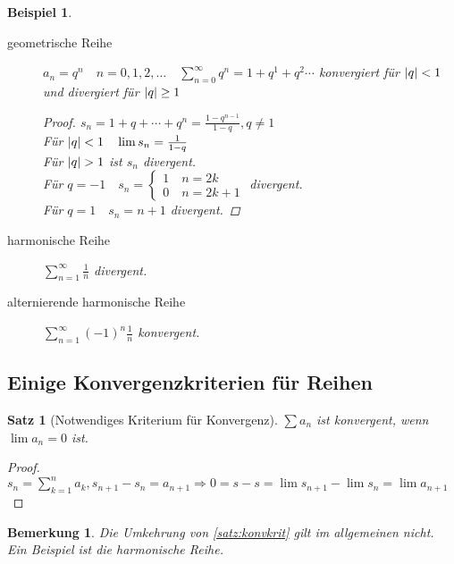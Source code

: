 \documentclass[ngerman,titlepage,twoside, parskip=half*]{scrreprt}
\theoremstyle{break}
\newtheorem{theorem}{Satz}[section]
\theoremstyle{nonumberbreak}
\newtheorem{remark}{Bemerkung}
\newtheorem{beispiel}{Beispiel}
\newtheorem{proof}{Beweis:}
\DeclarePairedDelimiter{\abs}{\lvert}{\rvert}
\begin{document}
\begin{beispiel}
  \begin{description}
  \item[geometrische Reihe] $a_n=q^n \quad n=0,1,2,\ldots \quad \sum_{n=0}^\infty q^n=1+q^1+q^2\cdots$
    kon\-ver\-giert für $\abs{q}<1$ und divergiert für $\abs{q}\geq 1$
    \begin{proof}
      $s_n =1+q+\cdots +q^n=\frac{1-q^{n-1}}{1-q}, q\neq 1$\\
    Für $\abs{q}<1 \quad \lim s_n=\frac{1}{1-q}$\\
    Für $\abs{q}>1$ ist $s_n$ divergent.\\
    Für $q=-1 \quad s_n=\begin{cases}1 \quad n=2k\\0 \quad n=2k+1\end{cases}$ divergent.\\
    Für $q=1 \quad s_n=n+1$ divergent.
    \end{proof}
  \item[harmonische Reihe] $\sum_{n=1}^\infty
    \frac{1}{n}$ divergent.
  \item[alternierende harmonische Reihe]  $\sum_{n=1}^\infty (-1)^n\frac{1}{n}$ konvergent.
\end{description}
\end{beispiel}

\subsection{Einige Konvergenzkriterien für Reihen}

\begin{theorem}[Notwendiges Kriterium für
  Konvergenz]
\label{satz:konvkrit}
$\sum a_n$ ist konvergent, wenn  $\lim a_n=0$ ist.
\end{theorem}
\begin{proof}
  $s_n=\sum_{k=1}^n a_k, s_{n+1}-s_n=a_{n+1} \Rightarrow
  0=s-s=\lim s_{n+1}-\lim s_n=\lim a_{n+1}$
\end{proof}

\begin{remark}
  Die Umkehrung von \autoref{satz:konvkrit} gilt im allgemeinen
  nicht. Ein Beispiel ist die harmonische Reihe.
\end{remark}
\end{document}
